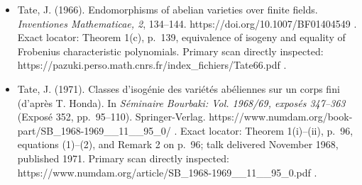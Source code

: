 \begin{itemize}
  monoids in this example are proved explicitly above.
\item
  Tate, J. (1966). Endomorphisms of abelian varieties over finite
  fields. \emph{Inventiones Mathematicae, 2}, 134--144.
  https://doi.org/10.1007/BF01404549 . Exact locator: Theorem 1(c),
  p.~139, equivalence of isogeny and equality of Frobenius
  characteristic polynomials. Primary scan directly inspected:
  https://pazuki.perso.math.cnrs.fr/index\_fichiers/Tate66.pdf .
\item
  Tate, J. (1971). Classes d'isogénie des variétés abéliennes sur un
  corps fini (d'après T. Honda). In \emph{Séminaire Bourbaki: Vol.
  1968/69, exposés 347--363} (Exposé 352, pp.~95--110). Springer-Verlag.
  https://www.numdam.org/book-part/SB\_1968-1969\_\_11\_\_95\_0/ . Exact
  locator: Theorem 1(i)--(ii), p.~96, equations (1)--(2), and Remark 2
  on p.~96; talk delivered November 1968, published 1971. Primary scan
  directly inspected:
  https://www.numdam.org/article/SB\_1968-1969\_\_11\_\_95\_0.pdf .
\end{itemize}

